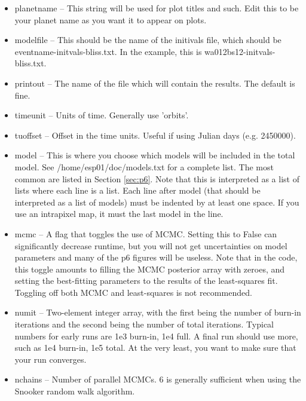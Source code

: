 \documentclass[letterpaper,12pt]{article}
\begin{document}
\begin{itemize}
\item planetname -- This string will be used for plot titles and such.
  Edit this to be your planet name as you want it to appear on plots.

\item modelfile -- This should be the name of the initivals file, which
  should be eventname-initvals-bliss.txt. In the example, this
  is wa012bs12-initvals-bliss.txt.

\item printout -- The name of the file which will contain the results. The
  default is fine.

\item timeunit -- Units of time. Generally use 'orbits'.

\item tuoffset -- Offset in the time units. Useful if using Julian days
  (e.g. 2450000).

\item model -- This is where you choose which models will be included
  in the total model. See /home/esp01/doc/models.txt for a complete
  list.  The most common are listed in Section \ref{sec:p6}. Note that
  this is interpreted as a list of lists where each line is a
  list. Each line after model (that should be interpreted as a list of
  models) must be indented by at least one space. If you use an
  intrapixel map, it must the last model in the line.

\item mcmc -- A flag that toggles the use of MCMC. Setting this to
  False can significantly decrease runtime, but you will not get
  uncertainties on model parameters and many of the p6 figures will
  be useless. Note that in the code, this toggle amounts to filling
  the MCMC posterior array with zeroes, and setting the best-fitting
  parameters to the results of the least-squares fit. Toggling off
  both MCMC and least-squares is not recommended.

\item numit -- Two-element integer array, with the first being the number
  of burn-in iterations and the second being the number of total iterations.
  Typical numbers for early runs are 1e3 burn-in, 1e4 full. A final run
  should use more, such as 1e4 burn-in, 1e5 total. At the very least, you
  want to make sure that your run converges.

\item nchains -- Number of parallel MCMCs. 6 is generally sufficient
  when using the Snooker random walk algorithm.


\end{itemize}
\end{document}

